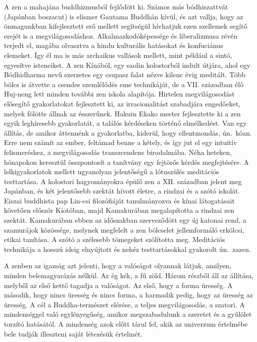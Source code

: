 A zen a mahajána buddhizmusból fejlődött ki. Számos más bódhiszattvát
(Japánban boszacut) is elismer Gautama Buddhán kívül, és
azt vallja, hogy az önmagunkban kifejlesztett erő mellett segítségül
hívhatjuk ezen szellemek segítő erejét is a megvilágosodáshoz.
Alkalmazkodóképessége és liberalizmusa révén terjedt el, magába
olvasztva a hindu kulturális hatásokat és konfuciánus elemeket. Így él
ma is más archaikus vallások mellett, mint például a sintó, egyesítve
isteneiket. A zen Kínából, egy saolin kolostorból indult útjára, ahol
egy Bódhidharma nevű szerzetes egy csupasz falat nézve kilenc évig
meditált. Több bölcs is átvette a csendes szemlélődés eme technikáját,
de a VII. században élő Huj-neng lett minden további zen iskola
alapítója. Hirtelen megvilágosodást elősegítő gyakorlatokat fejlesztett
ki, az irracionalitást szabadjára engedőeket, melyek fölötte állnak
az ésszerűnek. Hakuin Ekako mester fejlesztette ki a zen egyik
leghíresebb gyakorlatát, a találós kérdéseken történő elmélkedést.
Van egy állítás, de amikor áttennénk a gyakorlatba, kiderül, hogy
ellentmondás, ún.~kóan. Erre nem számít az ember, feltámad benne
a kétely, és így jut el egy intuitív felismeréshez, a megvilágosodás
transzcendens birodalmába. Néha heteken, hónapokon keresztül
összpontosít a tanítvány egy fejtörős kérdés megfejtésére.
A lelkigyakorlatok mellett ugyanolyan jelentőségű a lótuszülés meditációs
testtartása. A kolostori hagyományokra épülő zen a XII. században
jelent meg Japánban, és két jelentősebb szektát hívott életre, a rindzai
és a szótó iskolát. Eiszai buddhista pap Lin-csi filozófiáját
tanulmányozva és kínai látogatásait követően először Kiotóban, majd
Kamakurában megalapította a rindzai zen szektát. Kamakurában
ebben az időszakban szerveződött egy új katonai rend, a szamurájok
közössége, melynek megfelelt a zen bölcselet jellemformáló erkölcsi,
etikai tanítása. A szótó a szélesebb tömegeket szólította meg.
Meditációs technikája a hosszú ideig elnyújtott és nehéz testtartásokkal
gyakorolt ún.~zazen.

A zenben az igazság azt jelenti, hogy a valóságot olyannak látjuk,
amilyen, minden belemagyarázás nélkül. Az ég kék, a fű zöld.
Három részből áll az állítása, melyből az első kettő tagadja a valóságot.
Az első, hogy a forma üresség. A második, hogy nincs üresség
és nincs forma, a harmadik pedig, hogy az üresség az üresség.
A cél a Buddha-természet elérése, a teljes megvilágosodás, a szatori.
A mindenséggel való egylényegűség, amikor megszabadulunk a szeretet
és a gyűlölet torzító hatásától. A mindenség azok előtt tárul
fel, akik az univerzum értelmébe bele tudják illeszteni saját
létezésük értelmét.

